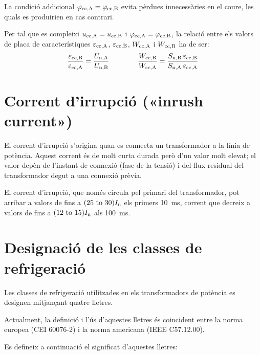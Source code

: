 La condició addicional $\varphi_\mathrm{cc,A} =\varphi_\mathrm{cc,B}$ evita pèrdues innecessàries en el coure, les quals es produirien en cas contrari.

Per tal que es compleixi $u_\mathrm{cc,A} = u_\mathrm{cc,B} $ i $\varphi_\mathrm{cc,A} =\varphi_\mathrm{cc,B}$, la relació entre els valors de placa de característiques $\varepsilon_\mathrm{cc,A}$, $\varepsilon_\mathrm{cc,B}$, $W_\mathrm{cc,A}$ i $W_\mathrm{cc,B}$ ha de ser:
\begin{equation}
    \frac{\varepsilon_\mathrm{cc,B}}{\varepsilon_\mathrm{cc,A}} = \frac{U_\mathrm{n,A}}{U_\mathrm{n,B}} \qquad\qquad
    \frac{W_\mathrm{cc,B}}{W_\mathrm{cc,A}} = \frac{S_\mathrm{n,B} \,\varepsilon_\mathrm{cc,B}}{S_\mathrm{n,A}\, \varepsilon_\mathrm{cc,A}}
\end{equation}

\section{Corrent d'irrupció («inrush current»)}

El corrent d'irrupció s'origina quan es  connecta un transformador a la línia de potència. Aquest corrent és de molt curta durada però d'un valor molt elevat; el valor depèn de l'instant de connexió (fase de la tensió) i del flux residual del transformador degut a una connexió prèvia.

El corrent d'irrupció, que només circula pel primari del transformador, pot arribar a valors de fins a $(\numrange{25}{30}) I\ped{n}$ els primers \SI{10}{ms}, corrent que decreix a valors de fins  a $(\numrange{12}{15}) I\ped{n}$ als \SI{100}{ms}.

\section{Designació de les classes de refrigeració}\label{sec:trafos-pot-refrig}
 

Les classes de refrigeració utilitzades en els transformadors de
potència es designen mitjançant quatre lletres.

Actualment, la definició i l'ús d'aquestes lletres és coincident
entre la norma europea (CEI 60076-2) i la norma americana
(IEEE C57.12.00).

Es defineix a continuació el significat d'aquestes lletres:

